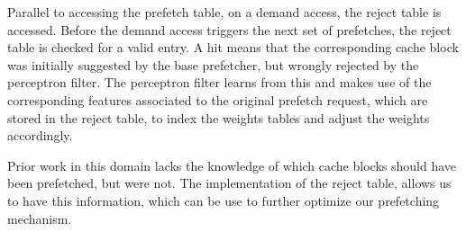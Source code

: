 
Parallel to accessing the prefetch table, on a demand access, the
reject table is accessed. Before the demand access triggers the next
set of prefetches, the reject table is checked for a valid entry. A
hit means that the corresponding cache block was initially suggested
by the base prefetcher, but wrongly rejected by the perceptron
filter. The perceptron filter learns from this and makes use of the
corresponding features associated to the original prefetch request,
which are stored in the reject table, to index the weights tables and
adjust the weights accordingly.

 Prior work in this domain
lacks the knowledge of which cache blocks should have been prefetched,
but were not. The implementation of the reject table, allows us to
have this information, which can be use to further optimize our
prefetching mechanism.

